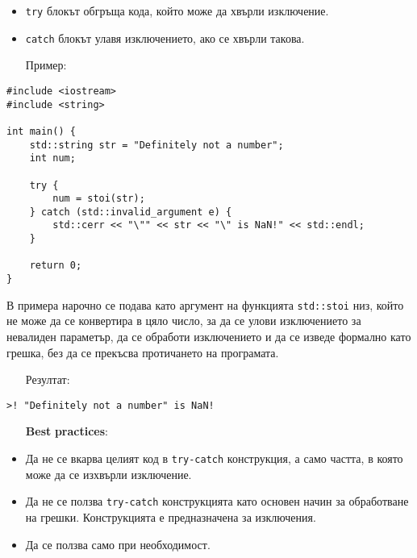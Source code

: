 \documentclass[oneside]{book}
\newcommand*{\code}[1]{\texttt{#1}}
\begin{document}
\begin{itemize}
    \item \code{try} блокът обгръща кода, който може да хвърли изключение.
    \item \code{catch} блокът улавя изключението, ако се хвърли такова.
\end{itemize}
\pagebreak
\begin{itemize}\item[Пример:]\end{itemize}
\begin{mdframed}\begin{lstlisting}
#include <iostream>
#include <string>

int main() {
    std::string str = "Definitely not a number";
    int num;

    try {
        num = stoi(str);
    } catch (std::invalid_argument e) {
        std::cerr << "\"" << str << "\" is NaN!" << std::endl;
    }

    return 0;
}
\end{lstlisting}\end{mdframed}

В примера нарочно се подава като аргумент на функцията \code{std::stoi} низ, който не може да се конвертира в цяло число,
за да се улови изключението за невалиден параметър, да се обработи изключението и да се изведе формално като грешка, без да се прекъсва протичането на програмата.

\begin{itemize}\item[Резултат:]\end{itemize}
\begin{mdframed}\begin{lstlisting}
>! "Definitely not a number" is NaN!
\end{lstlisting}\end{mdframed}

\begin{itemize}\item[\textbf{Best}] \textbf{practices}:\end{itemize}
\begin{itemize}
    \item Да не се вкарва целият код в \code{try-catch} конструкция, а само частта, в която може да се изхвърли изключение.
    \item Да не се ползва \code{try-catch} конструкцията като основен начин за обработване на грешки. Конструкцията е предназначена за изключения.
    \item Да се ползва само при необходимост.
\end{itemize}
\end{document}
